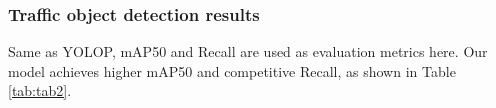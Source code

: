 \documentclass[10pt,twocolumn,letterpaper]{article}
\begin{document}
\begin{table}[htbp]
    \footnotesize
    \begin{center}
    \end{center}
    \caption{Comparison of model parameter and inference speed.}
    \label{tab:tab1}
\end{table}

\subsubsection{Traffic object detection results}
Same as YOLOP, mAP50 and Recall are used as evaluation metrics here. Our model achieves higher mAP50 and competitive Recall, as shown in Table \ref{tab:tab2}.
\end{document}
